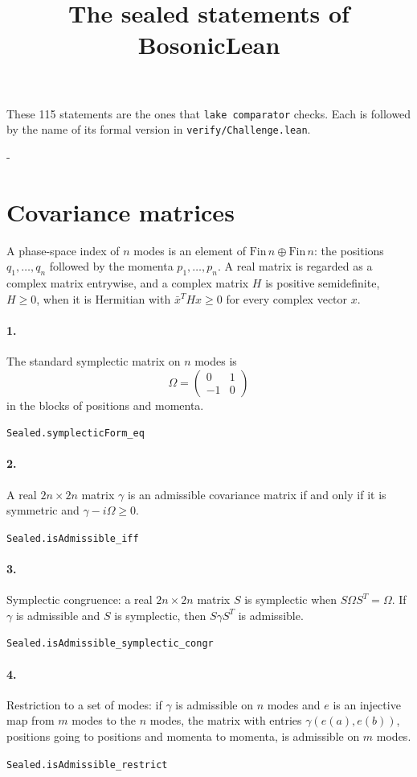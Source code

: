 \documentclass[11pt]{article}
\title{The sealed statements of BosonicLean}\date{}
\makeatletter
\newcommand{\keepspace}[1]{\par\penalty-100\begingroup\setlength{\dimen@}{#1}\dimen@ii\pagegoal\advance\dimen@ii-\pagetotal\ifdim\dimen@>\dimen@ii\ifdim\dimen@ii>\z@\vfil\fi\break\fi\endgroup}
\makeatother
\begin{document}
\maketitle
These 115 statements are the ones that \texttt{lake comparator} checks. Each is followed by the name of its formal version in \texttt{verify/Challenge.lean}.

\keepspace{14\baselineskip}\section*{Covariance matrices}
A phase-space index of $n$ modes is an element of $\mathrm{Fin}\, n \oplus \mathrm{Fin}\, n$: the positions $q_1, \dots, q_n$ followed by the momenta $p_1, \dots, p_n$. A real matrix is regarded as a complex matrix entrywise, and a complex matrix $H$ is positive semidefinite, $H \ge 0$, when it is Hermitian with $\bar x^T H x \ge 0$ for every complex vector $x$.

\paragraph{1.} The standard symplectic matrix on $n$ modes is \[\Omega = \begin{pmatrix} 0 & 1 \\ -1 & 0 \end{pmatrix}\] in the blocks of positions and momenta.\par{\footnotesize\texttt{Sealed.symplecticForm\_eq}}

\paragraph{2.} A real $2n \times 2n$ matrix $\gamma$ is an admissible covariance matrix if and only if it is symmetric and $\gamma - i\Omega \ge 0$.\par{\footnotesize\texttt{Sealed.isAdmissible\_iff}}

\paragraph{3.} Symplectic congruence: a real $2n \times 2n$ matrix $S$ is symplectic when $S \Omega S^T = \Omega$. If $\gamma$ is admissible and $S$ is symplectic, then $S \gamma S^T$ is admissible.\par{\footnotesize\texttt{Sealed.isAdmissible\_symplectic\_congr}}

\paragraph{4.} Restriction to a set of modes: if $\gamma$ is admissible on $n$ modes and $e$ is an injective map from $m$ modes to the $n$ modes, the matrix with entries $\gamma(e(a), e(b))$, positions going to positions and momenta to momenta, is admissible on $m$ modes.\par{\footnotesize\texttt{Sealed.isAdmissible\_restrict}}
\end{document}
